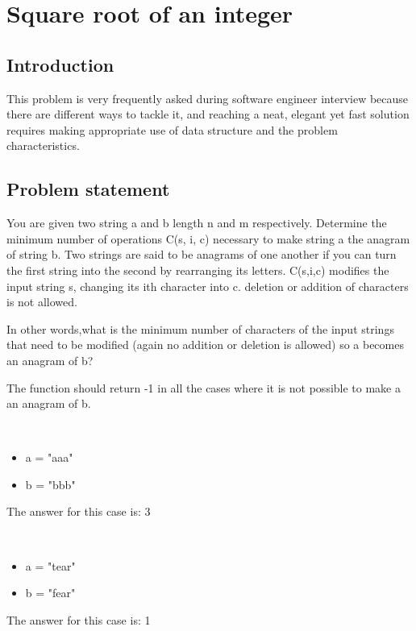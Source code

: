 %


\chapter{Square root of an integer}
\label{ch:square_root}
\section*{Introduction}
This problem is very frequently asked during software engineer  interview because there are different ways to tackle it, and reaching a neat, elegant yet fast solution requires making appropriate use of data structure and the problem characteristics.


\section{Problem statement}
You are given two string a and b  length n and m respectively.  Determine the minimum number of operations C(s, i, c) necessary to make string a the anagram of string b.  Two strings are said to be anagrams of one another if you can turn the first string into
the second by rearranging its letters.
C(s,i,c) modifies the input string s, changing its ith character into c. deletion or addition of characters is not allowed.

In other words,what is the minimum number of  characters of the input strings that  need to be modified (again no addition or deletion is allowed)  so a becomes an anagram of b?

The function should return -1 in all the cases where it is not possible to make a an anagram of b.

\begin{example}
	\hfill \\
	\begin{itemize}
		\item[] 	a = "aaa"
		\item[] 	b = "bbb"
	\end{itemize}
	 The answer for this case is: 3

\end{example}

\begin{example}
	\hfill \\
	\begin{itemize}
		\item[] 	a = "tear"
		\item[] 	b = "fear"
	\end{itemize}
	 The answer for this case is: 1

\end{example}

